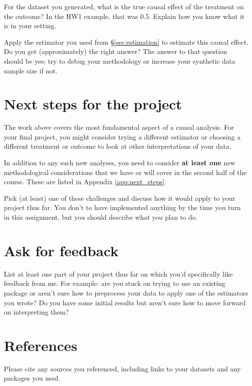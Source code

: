 \documentclass[12pt]{article}
\begin{document}
For the dataset you generated, what is the true causal effect of the treatment
on the outcome? In the HW1 example, that was 0.5. Explain how you know what it
is in your setting.

Apply the estimator you used from \S\ref{sec:estimation} to estimate this
causal effect. Do you get (approximately) the right answer? The answer to that
question should be yes; try to debug your methodology or increase your
synthetic data sample size if not.

\section{Next steps for the project} \label{sec:next_steps}

The work above covers the most fundamental aspect of a causal analysis. For
your final project, you might consider trying a different estimator or choosing
a different treatment or outcome to look at other interpretations of your data.

In addition to any such new analyses, you need to consider {\bf at least
one} new methodological considerations that we have or will
cover in the second half of the course. These are listed in Appendix \ref{app:next_steps}.

Pick (at least) one of these challenges and discuss how it would apply to your
project thus far. You don't to have implemented anything by the time you turn
in this assignment, but you should describe what you plan to do.

\section{Ask for feedback}

List at least one part of your project thus far on which you'd specifically like
feedback from me. For example: are you stuck on trying to use an existing
package or aren't sure how to preprocess your data to apply one of the
estimators you wrote? Do you have some initial results but aren't sure how to
move forward on interpreting them?

\section*{References}

Please cite any sources you referenced, including links to your datasets and
any packages you used.

\clearpage
\end{document}
